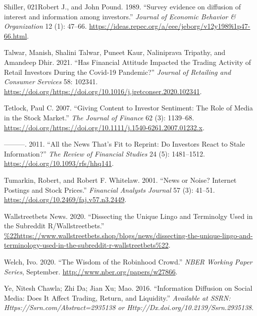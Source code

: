 \documentclass[12pt,]{article}
\begin{document}
\leavevmode\hypertarget{ref-shiller1989}{}%
Shiller, 021Robert J., and John Pound. 1989. ``Survey evidence on
diffusion of interest and information among investors.'' \emph{Journal
of Economic Behavior \& Organization} 12 (1): 47--66.
\url{https://ideas.repec.org/a/eee/jeborg/v12y1989i1p47-66.html}.

\leavevmode\hypertarget{ref-talwar2021}{}%
Talwar, Manish, Shalini Talwar, Puneet Kaur, Naliniprava Tripathy, and
Amandeep Dhir. 2021. ``Has Financial Attitude Impacted the Trading
Activity of Retail Investors During the Covid-19 Pandemic?''
\emph{Journal of Retailing and Consumer Services} 58: 102341.
\url{https://doi.org/https://doi.org/10.1016/j.jretconser.2020.102341}.

\leavevmode\hypertarget{ref-tetlock2007}{}%
Tetlock, Paul C. 2007. ``Giving Content to Investor Sentiment: The Role
of Media in the Stock Market.'' \emph{The Journal of Finance} 62 (3):
1139--68.
\url{https://doi.org/https://doi.org/10.1111/j.1540-6261.2007.01232.x}.

\leavevmode\hypertarget{ref-tetlock2011}{}%
---------. 2011. ``All the News That's Fit to Reprint: Do Investors
React to Stale Information?'' \emph{The Review of Financial Studies} 24
(5): 1481--1512. \url{https://doi.org/10.1093/rfs/hhq141}.

\leavevmode\hypertarget{ref-tumarkin2001}{}%
Tumarkin, Robert, and Robert F. Whitelaw. 2001. ``News or Noise?
Internet Postings and Stock Prices.'' \emph{Financial Analysts Journal}
57 (3): 41--51. \url{https://doi.org/10.2469/faj.v57.n3.2449}.

\leavevmode\hypertarget{ref-wsbshop}{}%
Wallstreetbets News. 2020. ``Dissecting the Unique Lingo and Terminolgy
Used in the Subreddit R/Wallstreetbets.''
\url{\%22https://www.wallstreetbets.shop/blogs/news/dissecting-the-unique-lingo-and-terminology-used-in-the-subreddit-r-wallstreetbets\%22}.

\leavevmode\hypertarget{ref-welch2020}{}%
Welch, Ivo. 2020. ``The Wisdom of the Robinhood Crowd.'' \emph{NBER
Working Paper Series}, September.
\url{http://www.nber.org/papers/w27866}.

\leavevmode\hypertarget{ref-chawla2016}{}%
Ye, Nitesh Chawla; Zhi Da; Jian Xu; Mao. 2016. ``Information Diffusion
on Social Media: Does It Affect Trading, Return, and Liquidity.''
\emph{Available at SSRN: Https://Ssrn.com/Abstract=2935138 or
Http://Dx.doi.org/10.2139/Ssrn.2935138}.





\newpage
\singlespacing 
\end{document}
